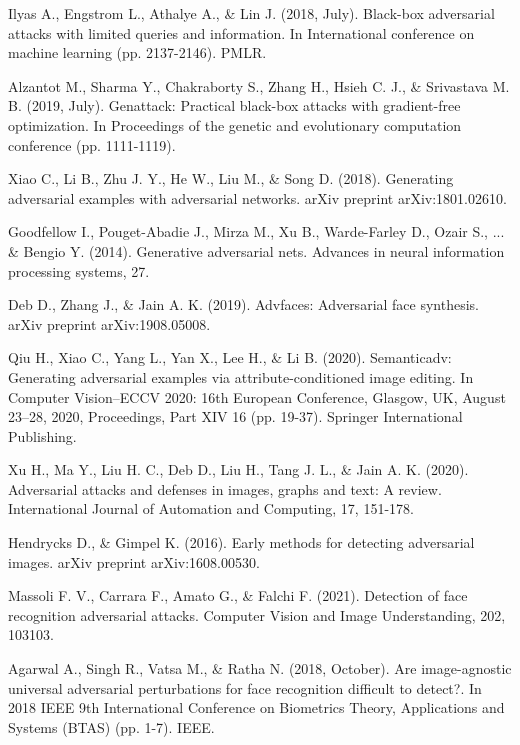 \begin{thebibliography}{}
Ilyas A., Engstrom L., Athalye A., \& Lin J. (2018, July). Black-box adversarial attacks with limited queries and information. In International conference on machine learning (pp. 2137-2146). PMLR.

Alzantot M., Sharma Y., Chakraborty S., Zhang H., Hsieh C. J., \& Srivastava M. B. (2019, July). Genattack: Practical black-box attacks with gradient-free optimization. In Proceedings of the genetic and evolutionary computation conference (pp. 1111-1119).

Xiao C., Li B., Zhu J. Y., He W., Liu M., \& Song D. (2018). Generating adversarial examples with adversarial networks. arXiv preprint arXiv:1801.02610.

Goodfellow I., Pouget-Abadie J., Mirza M., Xu B., Warde-Farley D., Ozair S., ... \& Bengio Y. (2014). Generative adversarial nets. Advances in neural information processing systems, 27.



Deb D., Zhang J., \& Jain A. K. (2019). Advfaces: Adversarial face synthesis. arXiv preprint arXiv:1908.05008.

Qiu H., Xiao C., Yang L., Yan X., Lee H., \& Li B. (2020). Semanticadv: Generating adversarial examples via attribute-conditioned image editing. In Computer Vision–ECCV 2020: 16th European Conference, Glasgow, UK, August 23–28, 2020, Proceedings, Part XIV 16 (pp. 19-37). Springer International Publishing.

Xu H., Ma Y., Liu H. C., Deb D., Liu H., Tang J. L., \& Jain A. K. (2020). Adversarial attacks and defenses in images, graphs and text: A review. International Journal of Automation and Computing, 17, 151-178.

Hendrycks D., \& Gimpel K. (2016). Early methods for detecting adversarial images. arXiv preprint arXiv:1608.00530.

Massoli F. V., Carrara F., Amato G., \& Falchi F. (2021). Detection of face recognition adversarial attacks. Computer Vision and Image Understanding, 202, 103103.

Agarwal A., Singh R., Vatsa M., \& Ratha N. (2018, October). Are image-agnostic universal adversarial perturbations for face recognition difficult to detect?. In 2018 IEEE 9th International Conference on Biometrics Theory, Applications and Systems (BTAS) (pp. 1-7). IEEE.


\end{thebibliography}
